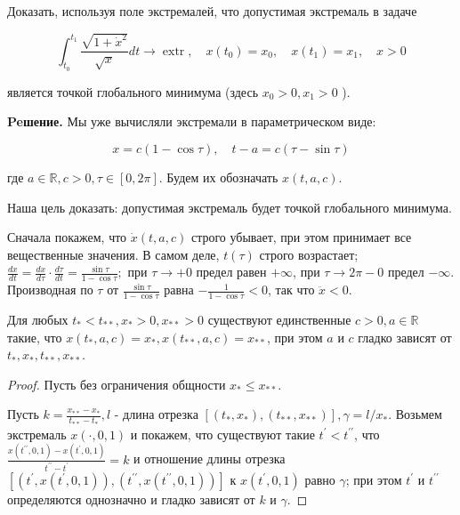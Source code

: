 \begin{task}
Доказать, используя поле экстремалей, что допустимая экстремаль в задаче

$$
\int_{t_{0}}^{t_{1}} \frac{\sqrt{1+\dot{x}^{2}}}{\sqrt{x}} d t \rightarrow \operatorname{extr}, \quad x\left(t_{0}\right)=x_{0}, \quad x\left(t_{1}\right)=x_{1}, \quad x>0
$$

является точкой глобального минимума (здесь $x_{0}>0, x_{1}>0$ ).

\textbf{Peшение.} Мы уже вычисляли экстремали в параметрическом виде:

$$
x=c(1-\cos \tau), \quad t-a=c(\tau-\sin \tau)
$$

где $a \in \mathbb{R}, c>0, \tau \in[0,2 \pi]$. Будем их обозначать $x(t, a, c)$.

Наша цель доказать: допустимая экстремаль будет точкой глобального минимума.

Сначала покажем, что $\dot{x}(t, a, c)$ строго убывает, при этом принимает все вещественные значения. В самом деле, $t(\tau)$ строго возрастает; $\frac{d x}{d t}=\frac{d x}{d \tau} \cdot \frac{d \tau}{d t}=\frac{\sin \tau}{1-\cos \tau} ;$ при $\tau \rightarrow+0$ предел равен $+\infty$, при $\tau \rightarrow 2 \pi-0$ предел $-\infty$. Производная по $\tau$ от $\frac{\sin \tau}{1-\cos \tau}$ равна $-\frac{1}{1-\cos \tau}<0$, так что $\ddot{x}<0$.

\begin{theorem}
    Для любых $t_{*}<t_{* *}, x_{*}>0, x_{* *}>0$ существуют единственные $c>0, a \in \mathbb{R}$ такие, что 
    $x\left(t_{*}, a, c\right)=x_{*}, x\left(t_{* *}, a, c\right)=x_{* *}$, при этом $a$ и $c$ гладко зависят от $t_{*}, x_{*}, t_{* *}, x_{* *}$.
\end{theorem}

\begin{proof} 
    Пусть без ограничения общности $x_{*} \leq x_{* *}$.

Пусть $k=\frac{x_{* *}-x_{*}}{t_{* *}-t_{*}}, l$ - длина отрезка $\left[\left(t_{*}, x_{*}\right),\left(t_{* *}, x_{* *}\right)\right], \gamma=l / x_{*}$. Возьмем экстремаль $x(\cdot, 0,1)$ и покажем, что существуют такие $t^{\prime}<t^{\prime \prime}$, что $\frac{x\left(t^{\prime \prime}, 0,1\right)-x\left(t^{\prime}, 0,1\right)}{t^{\prime \prime}-t^{\prime}}=k$ и отношение длины отрезка $\left[\left(t^{\prime}, x\left(t^{\prime}, 0,1\right)\right),\left(t^{\prime \prime}, x\left(t^{\prime \prime}, 0,1\right)\right)\right]$ к $x\left(t^{\prime}, 0,1\right)$ равно $\gamma$; при этом $t^{\prime}$ и $t^{\prime \prime}$ определяются однозначно и гладко зависят от $k$ и $\gamma$.


\end{proof}
\end{task}

